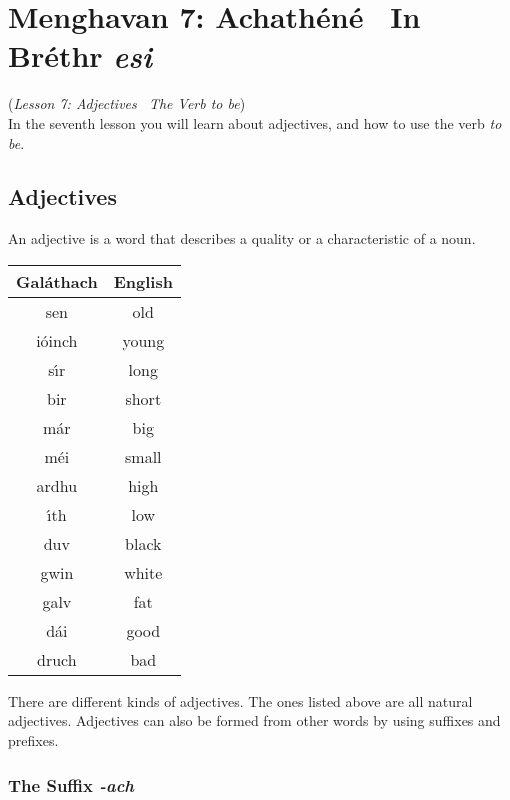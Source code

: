 \section{Menghavan 7: Achath\'{e}n\'{e} \textemdash\ In Br\'{e}thr \textit{esi}}
(\textit{Lesson 7: Adjectives \textemdash\ The Verb \textit{to be}})\\

In the seventh lesson you will learn about adjectives, and how to use the verb \textit{to be}.

\subsection{Adjectives}

An adjective is a word that describes a quality or a characteristic of a noun.
\begin{table}[H]
\centering
\begin{tabu}{c|c}
  \textbf{Gal\'{a}thach} & \textbf{English}\\
  \toprule
  sen & old\\
  i\'{o}inch & young\\
  s\'{\i}r & long\\
  bir & short\\
  m\'{a}r & big\\
  m\'{e}i & small\\
  ardhu & high\\
  \'{\i}th & low\\
  duv & black\\
  gwin & white\\
  galv & fat\\
  d\'{a}i & good\\
  druch & bad
\end{tabu}
\label{examples_adjective}
\end{table}

There are different kinds of adjectives. The ones listed above are all natural adjectives. Adjectives can also be formed from other words by using suffixes and prefixes.

\subsubsection{The Suffix \textit{-ach}}


